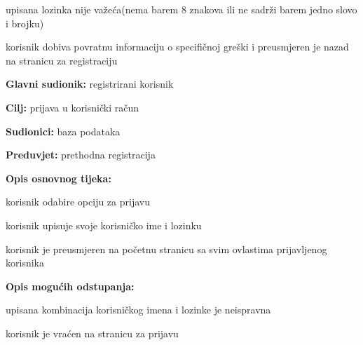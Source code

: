 \begin{packed_item}
\begin{packed_item}
\begin{packed_enum}
								
							\end{packed_enum}
							\item[2.b] upisana lozinka nije važeća(nema barem 8 znakova ili ne sadrži barem jedno slovo i brojku)
							\begin{packed_enum}
								
								\item korisnik dobiva povratnu informaciju o specifičnoj greški i preusmjeren je nazad na stranicu za              registraciju
								
								
							\end{packed_enum}
							
						\end{packed_item}
					\end{packed_item}
					
					\noindent {}
					\begin{packed_item}
						
						\item \textbf{Glavni sudionik: }registrirani korisnik
						\item  \textbf{Cilj:} prijava u korisnički račun
						\item  \textbf{Sudionici:} baza podataka
						\item  \textbf{Preduvjet:} prethodna registracija
						\item  \textbf{Opis osnovnog tijeka:}
						
						\item[] \begin{packed_enum}
							
							\item korisnik odabire opciju za prijavu
							\item korisnik upisuje svoje korisničko ime i lozinku
							\item korisnik je preusmjeren na početnu stranicu sa svim ovlastima prijavljenog korisnika
						
						\end{packed_enum}
						
						\item  \textbf{Opis mogućih odstupanja:}
						
						\item[] \begin{packed_item}
							
							\item[2.a] upisana kombinacija korisničkog imena i lozinke je neispravna
							\item[] \begin{packed_enum}
								
								\item korisnik je vraćen na stranicu za prijavu
								
							\end{packed_enum}
						
							
						\end{packed_item}
					\end{packed_item}
					
